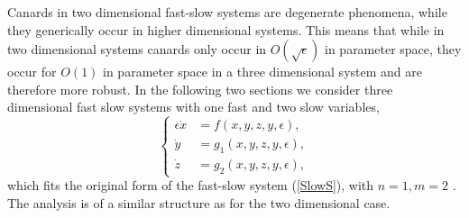 

Canards in two dimensional fast-slow systems are degenerate phenomena, while they generically occur in higher dimensional systems.
This means that while in two dimensional systems canards only occur in $O(\sqrt{\epsilon})$ in parameter space, they occur for $O(1)$ in parameter space in a three dimensional system and are therefore more robust.
In the following two sections we consider three dimensional fast slow systems with one fast and two slow variables,
\begin{equation}
\begin{cases}
\epsilon \dot{x} &=f(x,y,z,y,\epsilon),\\
\dot{y}&=g_1(x,y,z,y,\epsilon),\\
\dot{z}&=g_2(x,y,z,y,\epsilon),
\end{cases}\label{eq: fs singularity system}
\end{equation}
which fits the original form of the fast-slow system (\ref{SlowS}), with $n=1,m=2$ \citep{MMO}.
The analysis is of a similar structure as for the two dimensional case.\\

